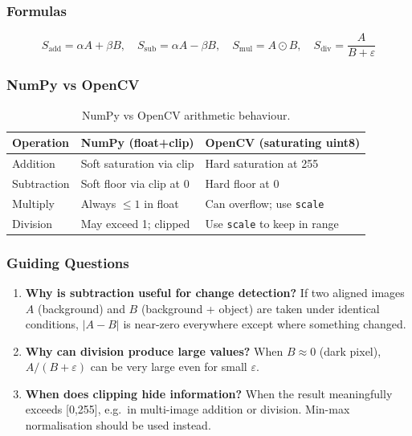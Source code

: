 \documentclass[12pt,a4paper]{article}
\begin{document}
\subsubsection*{Formulas}
\[
  S_{\text{add}} = \alpha A + \beta B, \quad
  S_{\text{sub}} = \alpha A - \beta B, \quad
  S_{\text{mul}} = A \odot B, \quad
  S_{\text{div}} = \frac{A}{B + \varepsilon}
\]

\subsubsection*{NumPy vs OpenCV}

\begin{table}[H]
  \centering
  \begin{tabular}{@{}lll@{}}
    \toprule
    Operation & NumPy (float+clip) & OpenCV (saturating uint8) \\
    \midrule
    Addition    & Soft saturation via clip & Hard saturation at 255 \\
    Subtraction & Soft floor via clip at 0 & Hard floor at 0 \\
    Multiply    & Always $\le 1$ in float & Can overflow; use \texttt{scale} \\
    Division    & May exceed 1; clipped    & Use \texttt{scale} to keep in range \\
    \bottomrule
  \end{tabular}
  \caption{NumPy vs OpenCV arithmetic behaviour.}
\end{table}

\subsubsection*{Guiding Questions}
\begin{enumerate}
  \item \textbf{Why is subtraction useful for change detection?}
        If two aligned images $A$ (background) and $B$ (background + object) are taken
        under identical conditions, $|A - B|$ is near-zero everywhere except where something
        changed.
  \item \textbf{Why can division produce large values?}
        When $B \approx 0$ (dark pixel), $A/(B+\varepsilon)$ can be very large even for
        small $\varepsilon$.
  \item \textbf{When does clipping hide information?}
        When the result meaningfully exceeds [0,255], e.g.\ in multi-image addition or
        division. Min-max normalisation should be used instead.
\end{enumerate}
\end{document}
